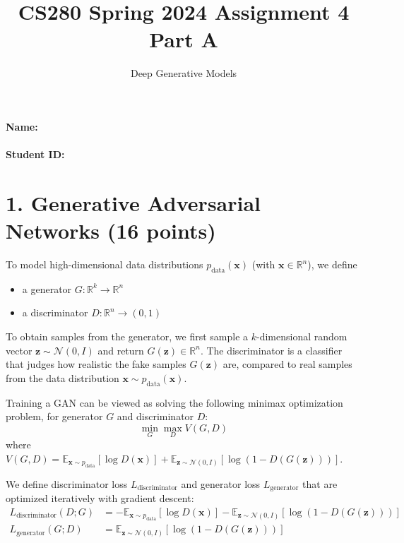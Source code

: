 \documentclass[12pt]{article}%
\begin{document}
\title{CS280 Spring 2024 Assignment 4 \\ Part A}
\author{Deep Generative Models}
\maketitle

\paragraph{Name:}

\paragraph{Student ID:}

\newpage

\section*{1. Generative Adversarial Networks (16 points)}

To model high-dimensional data distributions $p_{\text{data}}(\mathbf{x})$ (with $\mathbf{x} \in \mathbb{R}^n$), we define
\begin{itemize}
  \item a generator $G : \mathbb{R}^k \rightarrow \mathbb{R}^n$
  \item a discriminator $D : \mathbb{R}^n \rightarrow (0, 1)$
\end{itemize}

To obtain samples from the generator, we first sample a $k$-dimensional random vector $\mathbf{z} \sim \mathcal{N}(0, I)$ and return $G(\mathbf{z}) \in \mathbb{R}^n$. The discriminator is a classifier that judges how realistic the fake samples $G(\mathbf{z})$ are, compared to real samples from the data distribution $\mathbf{x} \sim p_{\text{data}}(\mathbf{x})$.


Training a GAN can be viewed as solving the following minimax optimization problem, for generator $G$ and discriminator $D$:
\[
  \min_G\max_D V(G, D)
\]
where\ $V(G, D) = \mathbb{E}_{\mathbf{x} \sim p_{\text{data}}}[\log D(\mathbf{x})] + \mathbb{E}_{\mathbf{z} \sim \mathcal{N}(0,I)}[\log (1 - D(G(\mathbf{z})))]$.

We define discriminator loss $L_{\text{discriminator}}$ and generator loss $L_{\text{generator}}$ that are optimized iteratively with gradient descent:
\begin{equation*}
  \begin{split}
    L_{\text{discriminator}}(D; G) & = - \mathbb{E}_{\mathbf{x} \sim p_{\text{data}}}[\log D(\mathbf{x})] - \mathbb{E}_{\mathbf{z} \sim \mathcal{N}(0,I)}[\log (1 - D(G(\mathbf{z})))] \\
    L_{\text{generator}}(G; D)  & = \mathbb{E}_{\mathbf{z} \sim \mathcal{N}(0,I)}[\log (1 - D(G(\mathbf{z})))]
  \end{split}
\end{equation*}
\end{document}
